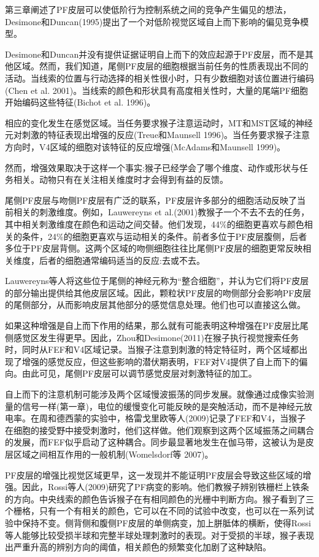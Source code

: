 第三章阐述了PF皮层可以使低阶行为控制系统之间的竞争产生偏见的想法，Desimone和Duncan(1995)提出了一个对低阶视觉区域自上而下影响的偏见竞争模型。

Desimone和Duncan并没有提供证据证明自上而下的效应起源于PF皮层，而不是其他区域。然而，我们知道，尾侧PF皮层的细胞根据当前任务的性质表现出不同的活动。当线索的位置与行动选择的相关性很小时，只有少数细胞对该位置进行编码(Chen et al. 2001)。当线索的颜色和形状具有高度相关性时，大量的尾端PF细胞开始编码这些特征(Bichot et al. 1996)。

相应的变化发生在感觉区域。当任务要求猴子注意运动时，MT和MST区域的神经元对刺激的特征表现出增强的反应(Treue和Maunsell 1996)。当任务要求猴子注意方向时，V4区域的细胞对该特征的反应增强(McAdams和Maunsell 1999)。

然而，增强效果取决于这样一个事实:猴子已经学会了哪个维度、动作或形状与任务相关。动物只有在关注相关维度时才会得到有益的反馈。

尾侧PF皮层与吻侧PF皮层有广泛的联系，PF皮层许多部分的细胞活动反映了当前相关的刺激维度。例如，Lauwereyns et al.(2001)教猴子一个不去不去的任务，其中相关刺激维度在颜色和运动之间交替。他们发现，44\%的细胞更喜欢与颜色相关的条件，24\%的细胞更喜欢与运动相关的条件。前者多位于PF皮层腹侧，后者多位于PF皮层背侧。这两个区域的吻侧细胞往往比尾侧PF皮层的细胞更常反映相关维度，后者的细胞通常编码适当的反应:去或不去。

Lauwereyns等人将这些位于尾侧的神经元称为“整合细胞”，并认为它们将PF皮层的部分输出提供给其他皮层区域。因此，颗粒状PF皮层的吻侧部分会影响PF皮层的尾侧部分，从而影响皮层其他部分的感觉信息处理。他们也可以直接这么做。

如果这种增强是自上而下作用的结果，那么就有可能表明这种增强在PF皮层比尾侧感觉区发生得更早。因此，Zhou和Desimone(2011)在猴子执行视觉搜索任务时，同时从FEF和V4区域记录。当猴子注意到刺激的特定特征时，两个区域都出现了增强的感觉反应，但这些影响的潜伏期表明，FEF对V4提供了自上而下的偏向。由此可见，尾侧PF皮层可以调节感觉皮层对刺激特征的加工。

自上而下的注意机制可能涉及两个区域慢波振荡的同步发展。就像通过成像实验测量的信号一样(第一章)，电位的缓慢变化可能反映的是突触活动，而不是神经元放电率。在周和德西蒙的实验中，格雷戈里欧等人(2009)记录了FEF和V4，当猴子在细胞的接受野中接受刺激时，他们这样做。他们观察到这两个区域振荡之间耦合的发展，而FEF似乎启动了这种耦合。同步最显著地发生在伽马带，这被认为是皮层区域之间相互作用的一般机制(Womelsdorf等 2007)。

PF皮层的增强比视觉区域更早，这一发现并不能证明PF皮层会导致这些区域的增强。因此，Rossi等人(2009)研究了PF病变的影响。他们教猴子辨别铁栅栏上铁条的方向。中央线索的颜色告诉猴子在有相同颜色的光栅中判断方向。猴子看到了三个栅格，只有一个有相关的颜色，它可以在不同的试验中改变，也可以在一系列试验中保持不变。侧背侧和腹侧PF皮层的单侧病变，加上胼胝体的横断，使得Rossi等人能够比较受损半球和完整半球处理刺激时的表现。对于受损的半球，猴子表现出严重升高的辨别方向的阈值，相关颜色的频繁变化加剧了这种缺陷。

